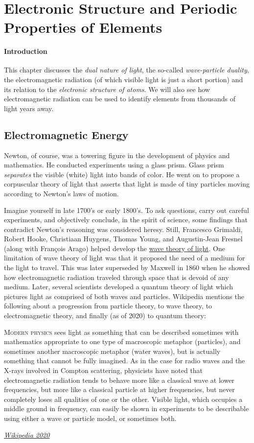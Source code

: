 \documentclass{article}
\begin{document}
\section{Electronic Structure and Periodic Properties of Elements}
\paragraph{Introduction}
This chapter discusses the \emph{dual nature of light}, the so-called \emph{wave-particle duality}, the electromagnetic radiation (of which visible light is just a short portion) and its relation to the \emph{electronic structure of atoms}. We will also see how electromagnetic radiation can be used to identify elements from thousands of light years away.

\subsection{Electromagnetic Energy}
Newton, of course, was a towering figure in the development of physics and mathematics. He conducted experiments using a glass prism. Glass prism \emph{separates} the visible (white) light into bands of color. He went on to propose a corpuscular theory of light that asserts that light is made of tiny particles moving according to Newton's laws of motion.

Imagine yourself in late 1700's or early 1800's. To ask questions, carry out careful experiments, and objectively conclude, in the spirit of science, some findings that contradict Newton's reasoning was considered heresy. Still, Francesco Grimaldi, Robert Hooke, Christiaan Huygens, Thomas Young, and Augustin-Jean Fresnel (along with François Arago) helped develop the \href{https://en.wikipedia.org/wiki/Light\#Wave_theory}{wave theory of light}. One limitation of wave theory of light was that it proposed the need of a medium for the light to travel. This was later superseded by Maxwell in 1860 when he showed how electromagnetic radiation traveled through space that is devoid of any medium. Later, several scientists developed a quantum theory of light which pictures light as comprised of both waves and particles. Wikipedia mentions the following about a progression from particle theory, to wave theory, to electromagnetic theory, and finally (as of 2020) to quantum theory:

\setlength{\epigraphwidth}{0.9\textwidth}
\epigraph
{
    \lettrine[lines=3]{M}{odern physics} sees light as something that can be described sometimes with mathematics appropriate to one type of macroscopic metaphor (particles), and sometimes another macroscopic metaphor (water waves), but is actually something that cannot be fully imagined. As in the case for radio waves and the X-rays involved in Compton scattering, physicists have noted that electromagnetic radiation tends to behave more like a classical wave at lower frequencies, but more like a classical particle at higher frequencies, but never completely loses all qualities of one or the other. Visible light, which occupies a middle ground in frequency, can easily be shown in experiments to be describable using either a wave or particle model, or sometimes both.
}
{
    \textit{\href{https://en.wikipedia.org/wiki/Light\#Quantum_theory}{Wikipedia 2020}}
}
\end{document}
